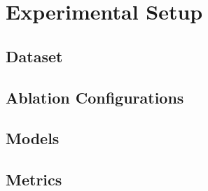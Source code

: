 \section{Experimental Setup}\label{sec:experiments}
\subsection{Dataset}
\subsection{Ablation Configurations}
\subsection{Models}
\subsection{Metrics}
